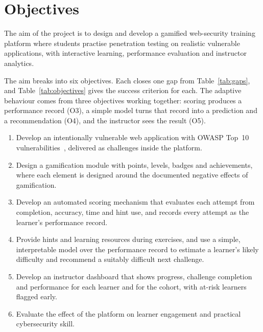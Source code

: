 \chapter{Objectives}
\label{ch:objectives}

The aim of the project is to design and develop a gamified web-security training platform where students practise penetration testing on realistic vulnerable applications, with interactive learning, performance evaluation and instructor analytics.

The aim breaks into six objectives. Each closes one gap from Table~\ref{tab:gaps}, and Table~\ref{tab:objectives} gives the success criterion for each. The adaptive behaviour comes from three objectives working together: scoring produces a performance record (O3), a simple model turns that record into a prediction and a recommendation (O4), and the instructor sees the result (O5).

\begin{enumerate}[label=\textbf{O\arabic*},leftmargin=2.6em,itemsep=0.45em]
\item Develop an intentionally vulnerable web application with OWASP Top~10 vulnerabilities~\cite{OwaspTop10}, delivered as challenges inside the platform.
\item Design a gamification module with points, levels, badges and achievements, where each element is designed around the documented negative effects of gamification.
\item Develop an automated scoring mechanism that evaluates each attempt from completion, accuracy, time and hint use, and records every attempt as the learner's performance record.
\item Provide hints and learning resources during exercises, and use a simple, interpretable model over the performance record to estimate a learner's likely difficulty and recommend a suitably difficult next challenge.
\item Develop an instructor dashboard that shows progress, challenge completion and performance for each learner and for the cohort, with at-risk learners flagged early.
\item Evaluate the effect of the platform on learner engagement and practical cybersecurity skill.
\end{enumerate}

